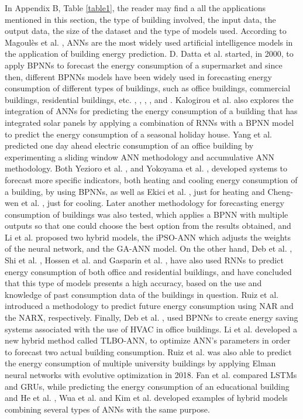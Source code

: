 In Appendix B, Table \ref{table1}, the reader may find a all the applications mentioned in this section, the type of building involved, the input data, the output data, the size of the dataset and the type of models used. According to Magoulès et al. \cite{ann1}, \ac{ANNs} are the most widely used artificial intelligence models in the application of building energy prediction. D. Datta et al. \cite{annr1} started, in 2000, to apply \ac{BPNN}s to forecast the energy consumption of a supermarket and since then, different \ac{BPNN}s models have been widely used in forecasting energy consumption of different types of buildings, such as office buildings, commercial buildings, residential buildings, etc. \cite{annr4}, \cite{annr9}, \cite{annr13}, \cite{annr14}, \cite{annr17} and \cite{annr19}. Kalogirou et al. \cite{annr2} also explores the integration of \ac{ANN}s for predicting the energy consumption of a building that has integrated solar panels by applying a combination of \ac{RNN}s with a \ac{BPNN} model to predict the energy consumption of a seasonal holiday house. Yang et al. \cite{annr3} predicted one day ahead electric consumption of an office building by experimenting a sliding window \ac{ANN} methodology and accumulative \ac{ANN} methodology. Both Yezioro et al. \cite{annr5}, and Yokoyama et al. \cite{annr7}, developed systems to forecast more specific indicators, both heating and cooling energy consumption of a building, by using \ac{BPNN}s, as well as Ekici et al. \cite{annr6}, just for heating and Cheng-wen et al. \cite{annr8}, just for cooling. Later another methodology for forecasting energy consumption of buildings was also tested, which applies a \ac{BPNN} with multiple outputs \cite{annr10} so that one could choose the best option from the results obtained, and Li et al.\cite{annr12} proposed two hybrid models, the \ac{iPSO-ANN} which adjusts the weights of the neural network, and the \ac{GA-ANN} model.
On the other hand, Deb et al. \cite{annr15}, Shi et al. \cite{annr16}, Hossen et al. \cite{annr18} and Gasparin et al. \cite{annr21},  have also used \ac{RNN}s to predict energy consumption of both office and residential buildings, and have concluded that this type of models presents a high accuracy, based on the use and knowledge of past consumption data of the buildings in question. Ruiz et al. \cite{annr22} introduced a methodology to predict future energy consumption using \ac{NAR} and the \ac{NARX}, respectively.
Finally, Deb et al. \cite{annr20}, used \ac{BPNN}s to create energy saving systems associated with the use of \ac{HVAC} in office buildings.
Li et al. \cite{annr24} developed a new hybrid method called \ac{TLBO-ANN}, to optimize \ac{ANN}’s parameters in order to forecast two actual building consumption. Ruiz et al. \cite{annr25} was also able to predict the energy consumption of multiple university buildings by applying Elman neural networks with evolutive optimization in 2018. Fan et al. \cite{annr26} compared \ac{LSTM}s and \ac{GRU}s, while predicting the energy consumption of an educational building and He et al. \cite{annr27}, Wua et al. \cite{annr28} and Kim et al. \cite{annr29} developed examples of hybrid models combining several types of \ac{ANN}s with the same purpose. 


